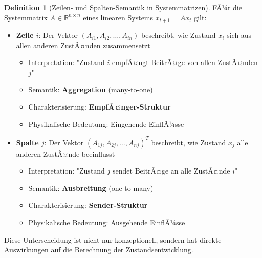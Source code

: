 ﻿\documentclass[a4paper,12pt]{report}
\theoremstyle{definition}
\newtheorem{definition}{Definition}
\begin{document}
	\begin{definition}[Zeilen- und Spalten-Semantik in Systemmatrizen]
		FÃ¼r die Systemmatrix $A \in \mathbb{R}^{n \times n}$ eines linearen Systems $x_{t+1} = Ax_t$ gilt:
		\begin{itemize}
			\item \textbf{Zeile $i$}: Der Vektor $(A_{i1}, A_{i2}, \ldots, A_{in})$ beschreibt, wie Zustand $x_i$ sich aus allen anderen ZustÃ¤nden zusammensetzt
			\begin{itemize}
				\item Interpretation: "Zustand $i$ empfÃ¤ngt BeitrÃ¤ge von allen ZustÃ¤nden $j$"
				\item Semantik: \textbf{Aggregation} (many-to-one)
				\item Charakterisierung: \textbf{EmpfÃ¤nger-Struktur}
				\item Physikalische Bedeutung: Eingehende EinflÃ¼sse
			\end{itemize}
			\item \textbf{Spalte $j$}: Der Vektor $(A_{1j}, A_{2j}, \ldots, A_{nj})^T$ beschreibt, wie Zustand $x_j$ alle anderen ZustÃ¤nde beeinflusst
			\begin{itemize}
				\item Interpretation: "Zustand $j$ sendet BeitrÃ¤ge an alle ZustÃ¤nde $i$"
				\item Semantik: \textbf{Ausbreitung} (one-to-many)
				\item Charakterisierung: \textbf{Sender-Struktur}
				\item Physikalische Bedeutung: Ausgehende EinflÃ¼sse
			\end{itemize}
		\end{itemize}
	\end{definition}
	
	Diese Unterscheidung ist nicht nur konzeptionell, sondern hat direkte Auswirkungen auf die Berechnung der Zustandsentwicklung.
	
\end{document}
